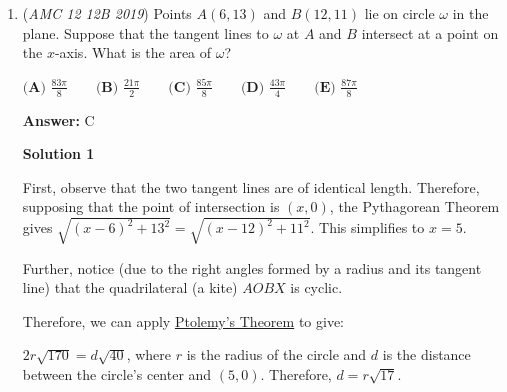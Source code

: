 \begin{enumerate}
 Our approximation of $0.214$ sits clearly closest to option $\textbf{(B)}$, allowing us to bypass full combinatorics tracking and safely select $\boxed{\textbf{(B) } \frac{1}{4}}$.

 



\textbf{Solution 7}

First, we consider an approximate scenario: Three fair coins are randomly dropped into three distinct pockets independently with equal probability. The probability that each pocket contains exactly one coin is $\frac{3}{3} \times \frac{2}{3} \times \frac{1}{3}$ = $\frac{2}{9}$ In this approximation, the probability of three coins in any one pocket is $\frac{1}{9}$, which is impossible. After removing it, our answer should be divided by $1 - \frac{1}{9}$ = $\frac{8}{9}$. Then the final probability is $\frac{2}{9} \div \frac{8}{9} = \frac{1}{4}$

 So the answer is $\boxed{\textbf{(B) } \frac{1}{4}}$.

 


 \textbf{Manim By MathInMotionPy} 


	\item (\textit{AMC 12 12B 2019}) Points $A(6,13)$ and $B(12,11)$ lie on circle $\omega$ in the plane. Suppose that the tangent lines to $\omega$ at $A$ and $B$ intersect at a point on the $x$-axis. What is the area of $\omega$?


 $\textbf{(A) }\frac{83\pi}{8}\qquad\textbf{(B) }\frac{21\pi}{2}\qquad\textbf{(C) } \frac{85\pi}{8}\qquad\textbf{(D) }\frac{43\pi}{4}\qquad\textbf{(E) }\frac{87\pi}{8}$

 \textbf{Answer: }C



\textbf{Solution 1}

First, observe that the two tangent lines are of identical length. Therefore, supposing that the point of intersection is $(x, 0)$, the Pythagorean Theorem gives $\sqrt{(x-6)^2 + 13^2} = \sqrt{(x-12)^2 + 11^2}$. This simplifies to $x = 5$.

 Further, notice (due to the right angles formed by a radius and its tangent line) that the quadrilateral (a kite) $AOBX$ is cyclic. 

 Therefore, we can apply \href{https://artofproblemsolving.com/wiki/index.php?title=Ptolemy\%27s\_Theorem}{Ptolemy's Theorem} to give:

 $2r\sqrt{170} = d \sqrt{40}$, where $r$ is the radius of the circle and $d$ is the distance between the circle's center and $(5, 0)$. Therefore, $d = r\sqrt{17}$. 


\end{enumerate}

